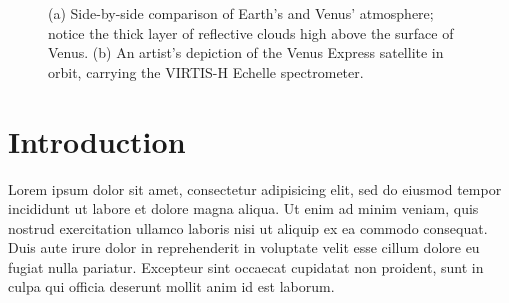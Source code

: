 \documentclass[5p]{elsarticle}
\begin{document}

\setcounter{topnumber}{1}


\begin{figure}[t]
\begin{center}
\end{center}
\caption{(a) Side-by-side comparison of Earth's and Venus' atmosphere; notice the thick layer of reflective clouds high above the surface of Venus. (b) An artist's depiction of the Venus Express satellite in orbit, carrying the VIRTIS-H Echelle spectrometer. }
\end{figure}

\section{Introduction}
Lorem ipsum dolor sit amet, consectetur adipisicing elit, sed do eiusmod tempor incididunt ut labore et dolore magna aliqua. Ut enim ad minim veniam, quis nostrud exercitation ullamco laboris nisi ut aliquip ex ea commodo consequat. Duis aute irure dolor in reprehenderit in voluptate velit esse cillum dolore eu fugiat nulla pariatur. Excepteur sint occaecat cupidatat non proident, sunt in culpa qui officia deserunt mollit anim id est laborum.
\end{document}
